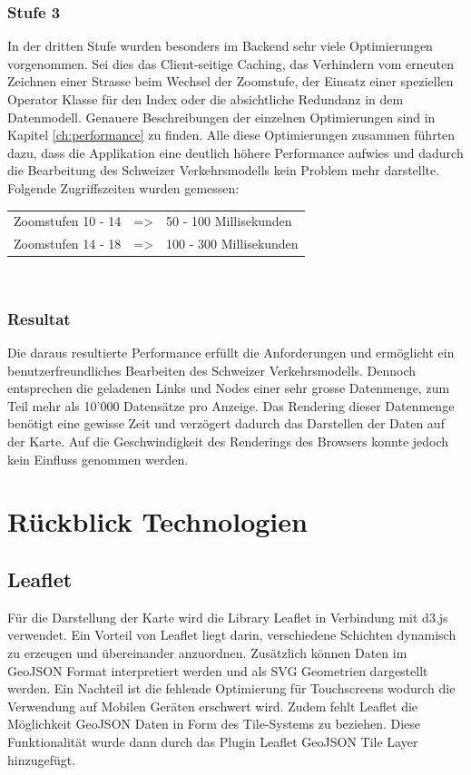 \subsubsection*{Stufe 3}
In der dritten Stufe wurden besonders im Backend sehr viele Optimierungen vorgenommen. Sei dies das Client-seitige Caching, das Verhindern vom erneuten Zeichnen einer Strasse beim Wechsel der Zoomstufe, der Einsatz einer speziellen Operator Klasse für den Index oder die absichtliche Redundanz in dem Datenmodell. Genauere Beschreibungen der einzelnen Optimierungen sind in Kapitel \ref{ch:performance}  zu finden. Alle diese Optimierungen zusammen führten dazu, dass die Applikation eine deutlich höhere Performance aufwies und dadurch die Bearbeitung des Schweizer Verkehrsmodells kein Problem mehr darstellte.\\
Folgende Zugriffszeiten wurden gemessen:\\[0.3cm]
\begin{tabular}{ l c l}
Zoomstufen 10 - 14 & => & 50 - 100 Millisekunden \\
Zoomstufen 14 - 18 & => & 100 - 300 Millisekunden \\ 
\end{tabular}\\
\subsubsection*{Resultat}
Die daraus resultierte Performance erfüllt die Anforderungen und ermöglicht ein benutzerfreundliches Bearbeiten des Schweizer Verkehrsmodells. Dennoch entsprechen die geladenen Links und Nodes einer sehr grosse Datenmenge, zum Teil mehr als 10'000 Datensätze pro Anzeige. Das Rendering dieser Datenmenge benötigt eine gewisse Zeit und verzögert dadurch das Darstellen der Daten auf der Karte. Auf die Geschwindigkeit des Renderings des Browsers konnte jedoch kein Einfluss genommen werden.
\newpage
\section{Rückblick Technologien}
\subsection*{Leaflet}
Für die Darstellung der Karte wird die Library Leaflet in Verbindung mit d3.js verwendet. Ein Vorteil von Leaflet liegt darin, verschiedene Schichten dynamisch zu erzeugen und übereinander anzuordnen. Zusätzlich können Daten im GeoJSON Format interpretiert werden und als SVG Geometrien dargestellt werden. Ein Nachteil ist die fehlende Optimierung für Touchscreens wodurch die Verwendung auf Mobilen Geräten erschwert wird. Zudem fehlt Leaflet die Möglichkeit GeoJSON Daten in Form des Tile-Systems zu beziehen. Diese Funktionalität wurde dann durch das Plugin Leaflet GeoJSON Tile Layer hinzugefügt.
